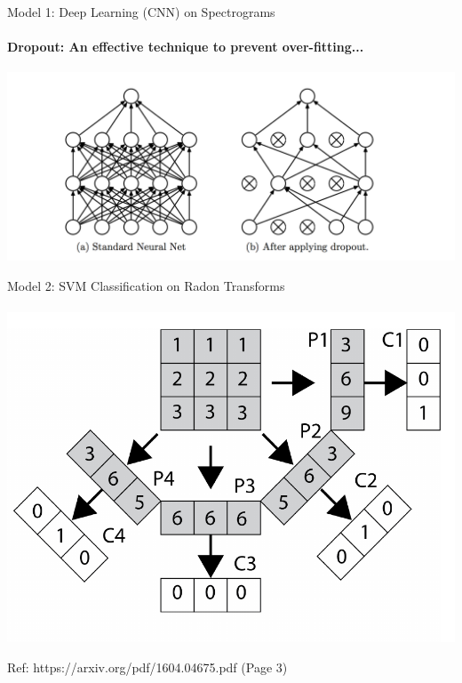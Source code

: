 \documentclass{beamer}
\begin{document}
\begin{frame}{Model 1: Deep Learning (CNN) on Spectrograms}
  \framesubtitle{Dropout: An effective technique to prevent over-fitting...}

  \begin{center}
  \includegraphics[scale=0.42]{img/dropout.png}
  \end{center}

\end{frame}



\begin{frame}{Model 2: SVM Classification on Radon Transforms}
  \framesubtitle{}

  \begin{center}
  \includegraphics[scale=0.38]{img/radon.png}

  Ref: https://arxiv.org/pdf/1604.04675.pdf (Page 3)
  \end{center}

\end{frame}
\end{document}
